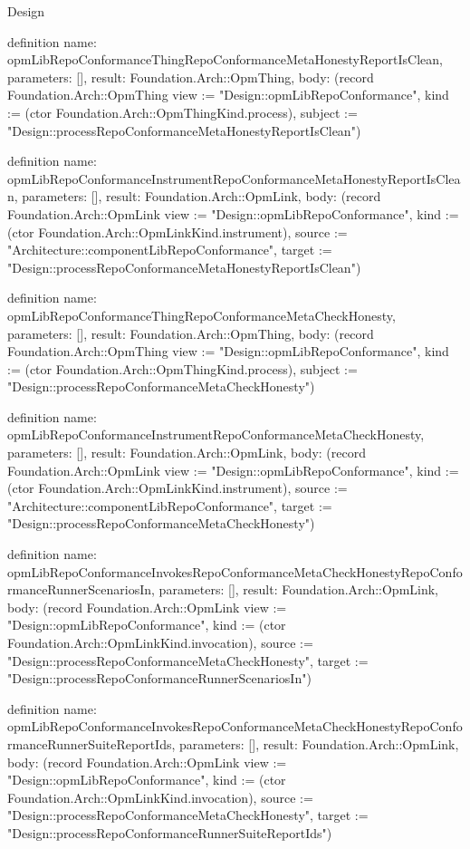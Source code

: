 \begin{lexlean}{Design}
\begin{semanticmodule}
definition{
  name: opmLibRepoConformanceThingRepoConformanceMetaHonestyReportIsClean,
  parameters: [],
  result: Foundation.Arch::OpmThing,
  body: (record Foundation.Arch::OpmThing {view := "Design::opmLibRepoConformance", kind := (ctor Foundation.Arch::OpmThingKind.process), subject := "Design::processRepoConformanceMetaHonestyReportIsClean"})
}

definition{
  name: opmLibRepoConformanceInstrumentRepoConformanceMetaHonestyReportIsClean,
  parameters: [],
  result: Foundation.Arch::OpmLink,
  body: (record Foundation.Arch::OpmLink {view := "Design::opmLibRepoConformance", kind := (ctor Foundation.Arch::OpmLinkKind.instrument), source := "Architecture::componentLibRepoConformance", target := "Design::processRepoConformanceMetaHonestyReportIsClean"})
}

definition{
  name: opmLibRepoConformanceThingRepoConformanceMetaCheckHonesty,
  parameters: [],
  result: Foundation.Arch::OpmThing,
  body: (record Foundation.Arch::OpmThing {view := "Design::opmLibRepoConformance", kind := (ctor Foundation.Arch::OpmThingKind.process), subject := "Design::processRepoConformanceMetaCheckHonesty"})
}

definition{
  name: opmLibRepoConformanceInstrumentRepoConformanceMetaCheckHonesty,
  parameters: [],
  result: Foundation.Arch::OpmLink,
  body: (record Foundation.Arch::OpmLink {view := "Design::opmLibRepoConformance", kind := (ctor Foundation.Arch::OpmLinkKind.instrument), source := "Architecture::componentLibRepoConformance", target := "Design::processRepoConformanceMetaCheckHonesty"})
}

definition{
  name: opmLibRepoConformanceInvokesRepoConformanceMetaCheckHonestyRepoConformanceRunnerScenariosIn,
  parameters: [],
  result: Foundation.Arch::OpmLink,
  body: (record Foundation.Arch::OpmLink {view := "Design::opmLibRepoConformance", kind := (ctor Foundation.Arch::OpmLinkKind.invocation), source := "Design::processRepoConformanceMetaCheckHonesty", target := "Design::processRepoConformanceRunnerScenariosIn"})
}

definition{
  name: opmLibRepoConformanceInvokesRepoConformanceMetaCheckHonestyRepoConformanceRunnerSuiteReportIds,
  parameters: [],
  result: Foundation.Arch::OpmLink,
  body: (record Foundation.Arch::OpmLink {view := "Design::opmLibRepoConformance", kind := (ctor Foundation.Arch::OpmLinkKind.invocation), source := "Design::processRepoConformanceMetaCheckHonesty", target := "Design::processRepoConformanceRunnerSuiteReportIds"})
}


\end{semanticmodule}
\end{lexlean}
